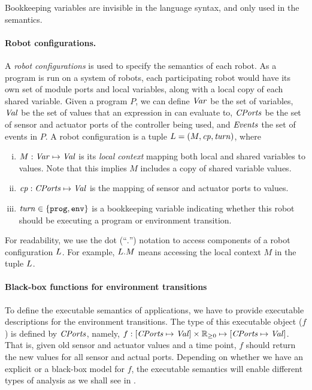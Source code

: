 Bookkeeping variables are invisible in the language syntax, and only used in the semantics.


\paragraph{Robot configurations.}

A \emph{robot configurations} is used to specify the semantics of each robot.
As a \lgname program is run on a system of robots,
each participating robot would have its own set of module ports and local variables,
along with a local copy of each shared variable.
Given a \lgname program $P$, we can define $\mathit{Var}$ be the set of variables,
$\mathit{Val}$ be the set of values that an expression in \lgname can evaluate to,
$\mathit{CPorts}$ be the set of sensor and actuator ports of the controller being used,
and $\mathit{Events}$ the set of events in $P$.
A robot configuration is a tuple $L = ({M},\mathit{cp},\mathit{turn})$, where

\begin{enumerate}[(i)]
\item ${M} : \mathit{Var} \mapsto \mathit{Val}$ is its \emph{local context} mapping both local and shared variables to values.
      Note that this implies $M$ includes a copy of shared variable values.
\item $\mathit{cp} : \mathit{CPorts} \mapsto \mathit{Val}$ is the mapping of sensor and actuator ports to values.
\item $\mathit{turn} \in \{\mathtt{prog},\mathtt{env}\}$ is a bookkeeping variable indicating whether this robot should be executing a program or environment transition.
\end{enumerate}
For readability, we use the dot (``$.$'') notation to access components of a robot configuration $L$.
For example, $L.M$ means accessing the local context $M$ in the tuple $L$.

\paragraph{Black-box functions for environment transitions}
To define the  executable \K semantics of  \lgname applications, we have to provide executable descriptions for the environment transitions. The type of this executable object ($f$) is defined by $\mathit{CPorts}$, namely,
$f: [\Cfield \mapsto \Val] \times \nnreals \mapsto [\Cfield \mapsto \Val]$.
That is, given old sensor and actuator values and a time point, $f$ should return the new values for all sensor and actual ports.
%
Depending on whether  we have an explicit or a black-box model for $f$,
the executable semantics will enable different types of analysis as we shall see in .


